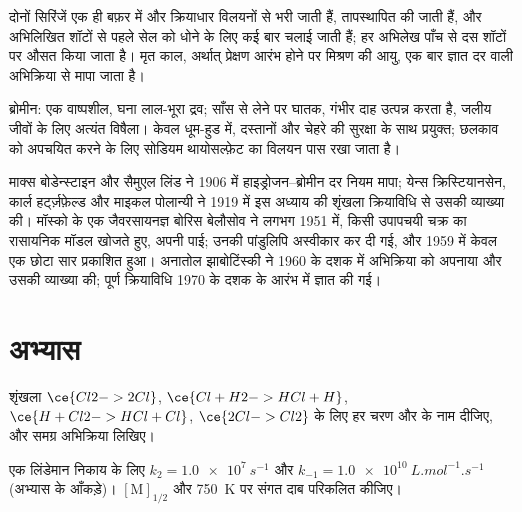 \begin{inthelab}[एक रुद्ध-प्रवाह मापन]
दोनों सिरिंजें एक ही बफ़र में  और क्रियाधार विलयनों से भरी जाती हैं,
तापस्थापित की जाती हैं, और अभिलिखित शॉटों से पहले सेल को धोने के लिए कई बार चलाई
जाती हैं; हर अभिलेख पाँच से दस शॉटों पर औसत किया जाता है। मृत काल,
अर्थात् प्रेक्षण आरंभ होने पर मिश्रण की आयु, एक बार ज्ञात दर वाली
अभिक्रिया से मापा जाता है।
\end{inthelab}

\begin{safety}{}
ब्रोमीन: एक वाष्पशील, घना लाल-भूरा द्रव; साँस से लेने पर घातक, गंभीर
दाह उत्पन्न करता है, जलीय जीवों के लिए अत्यंत विषैला। केवल धूम-हुड में, दस्तानों
और चेहरे की सुरक्षा के साथ प्रयुक्त; छलकाव को अपचयित करने के लिए सोडियम थायोसल्फ़ेट का
विलयन पास रखा जाता है।
\end{safety}

\begin{history}[बोडेन्स्टाइन और बेलौसोव]
माक्स बोडेन्स्टाइन और सैमुएल लिंड ने 1906 में हाइड्रोजन--ब्रोमीन दर नियम
मापा; येन्स क्रिस्टियानसेन, कार्ल हर्ट्ज़फ़ेल्ड और माइकल पोलान्यी ने
1919 में इस अध्याय की शृंखला क्रियाविधि से उसकी व्याख्या की। मॉस्को के एक जैवरसायनज्ञ
बोरिस बेलौसोव ने लगभग 1951 में, किसी उपापचयी चक्र का रासायनिक मॉडल खोजते हुए,
अपनी  पाई; उनकी पांडुलिपि अस्वीकार कर दी गई, और 1959 में केवल एक
छोटा सार प्रकाशित हुआ। अनातोल झाबोटिंस्की ने 1960 के दशक में अभिक्रिया को
अपनाया और उसकी व्याख्या की; पूर्ण क्रियाविधि 1970 के दशक के आरंभ में
ज्ञात की गई।
\end{history}

\section{अभ्यास}

\begin{exercise}[$\star$]\label{exo:b3:complex-kinetics:1}
शृंखला $\ce{Cl2 -> 2 Cl}$, $\ce{Cl + H2 -> HCl + H}$, $\ce{H + Cl2 -> HCl + Cl}$, $\ce{2 Cl -> Cl2}$ के लिए
हर चरण और  के नाम दीजिए, और समग्र अभिक्रिया लिखिए।
\end{exercise}

\begin{exercise}[$\star$]\label{exo:b3:complex-kinetics:2}
एक लिंडेमान निकाय के लिए $k_2 = \qty{1.0e7}{s^{-1}}$ और $k_{-1} = \qty{1.0e10}{L.mol^{-1}.s^{-1}}$ (अभ्यास के
आँकड़े)। $[\mathrm M]_{1/2}$ और \qty{750}{K} पर संगत दाब परिकलित कीजिए।
\end{exercise}

